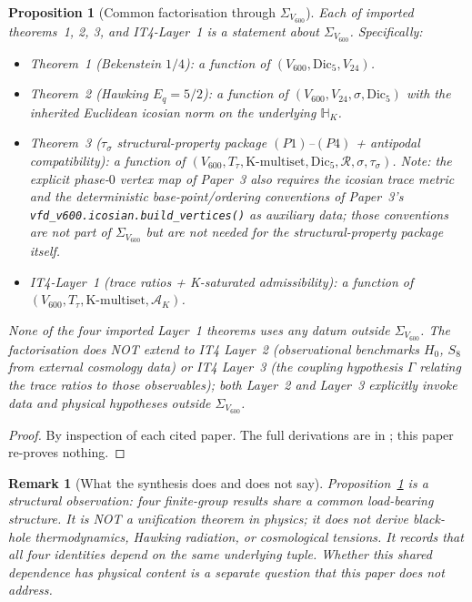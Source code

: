 \documentclass[11pt]{article}
\newtheorem{proposition}{Proposition}[section]
\newtheorem{remark}{Remark}[section]
\theoremstyle{remark}
\newcommand{\Vsixhundred}{V_{600}}
\newcommand{\Dicfive}{\mathrm{Dic}_5}
\newcommand{\Vtwentyfour}{V_{24}}
\newcommand{\Sigmaspine}{\Sigma_{\Vsixhundred}}
\newcommand{\Ttau}{T_{\tau}}
\newcommand{\sigmaG}{\sigma}
\newcommand{\tausigma}{\tau_\sigma}
\newcommand{\AK}{\mathcal{A}_K}
\newcommand{\Hzero}{H_0}
\begin{document}
\begin{proposition}[Common factorisation through $\Sigmaspine$]\label{prop:synthesis}
Each of imported theorems~1, 2, 3, and IT4-Layer~1 is a statement
about $\Sigmaspine$. Specifically:
\begin{itemize}[leftmargin=2em]
\item Theorem~1 (Bekenstein $1/4$): a function of
$(\Vsixhundred, \Dicfive, \Vtwentyfour)$.
\item Theorem~2 (Hawking $E_q = 5/2$): a function of
$(\Vsixhundred, \Vtwentyfour, \sigmaG, \Dicfive)$ with the inherited
Euclidean icosian norm on the underlying $\mathbb{H}_K$.
\item Theorem~3 ($\tausigma$ \emph{structural-property package}
$(P1)$--$(P4)$ + antipodal compatibility): a function of
$(\Vsixhundred, \Ttau, \mathrm{K\text{-multiset}}, \Dicfive,
\mathcal{R}, \sigmaG, \tausigma)$. Note: the explicit phase-$0$
vertex map of Paper~3 also requires the icosian trace metric and
the deterministic base-point/ordering conventions of Paper~3's
\texttt{vfd\_v600.icosian.build\_vertices()} as auxiliary data;
those conventions are not part of $\Sigmaspine$ but are not needed
for the structural-property package itself.
\item IT4-Layer~1 (trace ratios + K-saturated admissibility): a
function of
$(\Vsixhundred, \Ttau, \mathrm{K\text{-multiset}}, \AK)$.
\end{itemize}
None of the four imported Layer~1 theorems uses any datum outside
$\Sigmaspine$. The factorisation does NOT extend to IT4 Layer~2
(observational benchmarks $\Hzero$, $S_8$ from external cosmology
data) or IT4 Layer~3 (the coupling hypothesis $\Gamma$ relating the
trace ratios to those observables); both Layer~2 and Layer~3
explicitly invoke data and physical hypotheses outside $\Sigmaspine$.
\end{proposition}

\begin{proof}
By inspection of each cited paper. The full derivations are in
\citet{V600Paper1,V600Paper2,V600Paper3,V600Paper4}; this paper
re-proves nothing.
\end{proof}

\begin{remark}[What the synthesis does and does not say]\label{rem:synth}
Proposition~\ref{prop:synthesis} is a structural observation: four
finite-group results share a common load-bearing structure. It is
NOT a unification theorem in physics; it does not derive black-hole
thermodynamics, Hawking radiation, or cosmological tensions. It
records that all four
identities depend on the same underlying tuple. Whether this
shared dependence has physical content is a separate question that
this paper does not address.
\end{remark}
\end{document}
